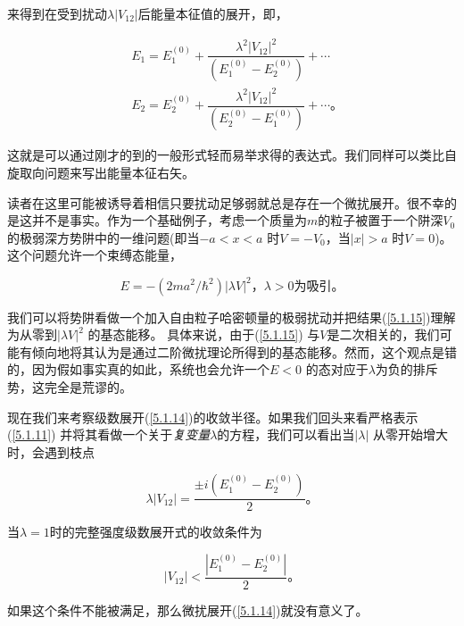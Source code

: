 ﻿\documentclass[UTF8,twoside]{ctexart}
\begin{document}
\noindent 来得到在受到扰动$\lambda|V_{12}|$后能量本征值的展开，即，

\begin{equation} \label{5.1.14}
\begin{split}
&E_1 = E_1^{\left(0\right)} + \dfrac{\lambda^2|V_{12}|^2}{\left(E_1^{\left(0\right)} - E_2^{\left(0\right)}\right)} + \cdots \\
&E_2 = E_2^{\left(0\right)} + \dfrac{\lambda^2|V_{12}|^2}{\left(E_2^{\left(0\right)} - E_1^{\left(0\right)}\right)} + \cdots\text{。}
\end{split}
\end{equation}

\noindent 这就是可以通过刚才的到的一般形式轻而易举求得的表达式。我们同样可以类比自旋取向问题来写出能量本征右矢。

读者在这里可能被诱导着相信只要扰动足够弱就总是存在一个微扰展开。很不幸的是这并不是事实。作为一个基础例子，考虑一个质量为$m$的粒子被置于一个阱深$V_0$的极弱深方势阱中的一维问题(即当$-a< x< a$ 时$V = -V_0$，当$ |x|>a$ 时$V = 0$)。 这个问题允许一个束缚态能量，

\begin{equation} \label{5.1.15}
E = -(2ma^2/\hbar^2)|\lambda V|^2\text{，}\lambda>0\text{为吸引。}
\end{equation}

\noindent 我们可以将势阱看做一个加入自由粒子哈密顿量的极弱扰动并把结果(\ref{5.1.15})理解为从零到$|\lambda V|^2$ 的基态能移。 具体来说，由于(\ref{5.1.15}) 与$V$是二次相关的，我们可能有倾向地将其认为是通过二阶微扰理论所得到的基态能移。然而，这个观点是错的，因为假如事实真的如此，系统也会允许一个$E<0$ 的态对应于$\lambda$为负的排斥势，这完全是荒谬的。

现在我们来考察级数展开(\ref{5.1.14})的收敛半径。如果我们回头来看严格表示(\ref{5.1.11}) 并将其看做一个关于\emph{复变量}$\lambda$的方程，我们可以看出当$|\lambda|$ 从零开始增大时，会遇到枝点

\begin{equation} \label{5.1.16}
\lambda|V_{12}| = \dfrac{\pm i\left(E_1^{\left(0\right)}-E_2^{\left(0\right)}\right)}{2}\text{。}
\end{equation}

\noindent 当$\lambda=1$时的完整强度级数展开式的收敛条件为

\begin{equation} \label{5.1.17}
|V_{12}|<\dfrac{|E_1^{\left(0\right)}-E_2^{\left(0\right)}|}{2}\text{。}
\end{equation}

\noindent 如果这个条件不能被满足，那么微扰展开(\ref{5.1.14})就没有意义了。
\end{document}
